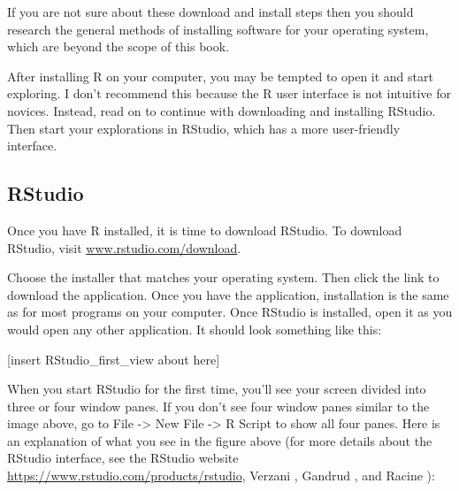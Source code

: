 \documentclass[]{book}
\begin{document}
If you are not sure about these download and install steps then you
should research the general methods of installing software for your
operating system, which are beyond the scope of this book.

After installing R on your computer, you may be tempted to open it and
start exploring. I don't recommend this because the R user interface is
not intuitive for novices. Instead, read on to continue with downloading
and installing RStudio. Then start your explorations in RStudio, which
has a more user-friendly interface.

\subsection{RStudio}\label{rstudio}

Once you have R installed, it is time to download RStudio. To download
RStudio, visit
\href{http://www.rstudio.com/download}{www.rstudio.com/download}.

Choose the installer that matches your operating system. Then click the
link to download the application. Once you have the application,
installation is the same as for most programs on your computer. Once
RStudio is installed, open it as you would open any other application.
It should look something like this:

{[}insert RStudio\_first\_view about here{]}

When you start RStudio for the first time, you'll see your screen
divided into three or four window panes. If you don't see four window
panes similar to the image above, go to File -\textgreater{} New File
-\textgreater{} R Script to show all four panes. Here is an explanation
of what you see in the figure above (for more details about the RStudio
interface, see the RStudio website
\url{https://www.rstudio.com/products/rstudio}, Verzani
\citeyearpar{verzani2011getting}, Gandrud \citeyearpar{Gandrud2015}, and
Racine \citeyearpar{racine2012rstudio}):
\end{document}
